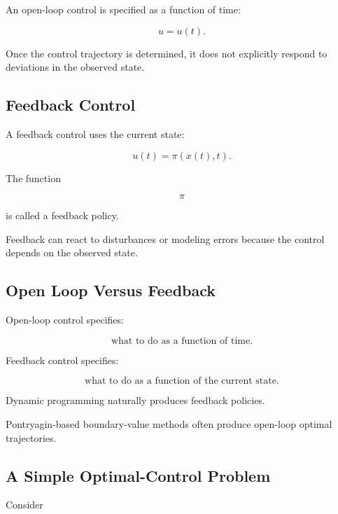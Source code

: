 An open-loop control is specified as a function of time:

\[
\boxed{
u=u(t).
}
\]

Once the control trajectory is determined, it does not explicitly respond
to deviations in the observed state.

\subsection{Feedback Control}
\label{subsec:feedback-control}

A feedback control uses the current state:

\[
\boxed{
u(t)
=
\pi
(
x(t),
t
).
}
\]

The function

\[
\pi
\]

is called a feedback policy.

Feedback can react to disturbances or modeling errors because the control
depends on the observed state.

\subsection{Open Loop Versus Feedback}
\label{subsec:open-loop-versus-feedback}

Open-loop control specifies:

\[
\boxed{
\text{what to do as a function of time}.
}
\]

Feedback control specifies:

\[
\boxed{
\text{what to do as a function of the current state}.
}
\]

Dynamic programming naturally produces feedback policies.

Pontryagin-based boundary-value methods often produce open-loop optimal
trajectories.

\subsection{A Simple Optimal-Control Problem}
\label{subsec:simple-optimal-control-problem}

Consider


